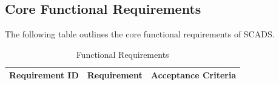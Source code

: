\documentclass{article}
\begin{document}
        \subsection{Core Functional Requirements}\label{sec:core-functional-requirements}

            The following table outlines the core functional requirements of
            SCADS.

            \renewcommand{\arraystretch}{1.4}
            \begin{longtable}{|l|p{9cm}|p{5cm}|}
                \caption{Functional Requirements} \\
                \hline
                \textbf{Requirement ID} & \textbf{Requirement} & 
                    \textbf{Acceptance Criteria} \\ \hline
                \endfirsthead


\end{longtable}
\end{document}
